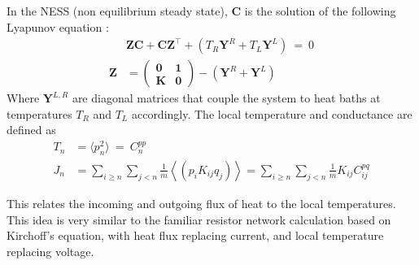 In the NESS (non equilibrium steady state), $\mathbf{C}$ 
is the solution of the following Lyapunov equation 
\cite{bodyfelt_unpub,zheng,zheng_heat_2011,bhatia_how_1997,dhar_heat_2008,rieder_properties_1967,*nakazawa_energy_1968,*matsuda_localization_1970}:
%
\begin{align}
&\mathbf{Z}\mathbf{C} + \mathbf{C}\mathbf{Z}^\intercal + (T_R\mathbf{Y}^R+T_L\mathbf{Y}^L) \ =\  0\\
\mathbf{Z} &= 
              \begin{pmatrix} 
                \mathbf{0} & \mathbf{1} \\
                \mathbf{K} & \mathbf{0} 
              \end{pmatrix} -(\mathbf{Y}^R+\mathbf{Y}^L)
\end{align}
%
Where $\mathbf{Y}^{L,R}$ are diagonal matrices that couple
the system to heat baths at temperatures $T_R$ and $T_L$ accordingly.
%
The local temperature and conductance are defined as
\begin{align}
T_n &= \langle p_n^2 \rangle \ = \ C^{pp}_{n} \\
J_n &= \sum_{i\ge n}\sum_{j<n} \frac{1}{m}\left\langle \left(p_i K_{ij} q_j\right) \right\rangle 
= \sum_{i\ge n}\sum_{j<n}\frac{1}{m}  K_{ij} C^{pq}_{ij}
\end{align}

This relates the incoming and outgoing flux of heat 
to the local temperatures. This idea is very similar
to the familiar resistor network calculation based on Kirchoff's equation, with 
heat flux replacing current, and local temperature replacing voltage. 
 

\begin{comment}
\section{Banded matrices spectrum}


For wide bandwidth and uncorrelated matrix elements, the high eigenvalues
should follow the Wigner semicircle law ($g(\lambda) = \frac{2}{\pi R^2}\sqrt{R^2-\lambda^2}$)
\cite{erdos_local_2012,fyodorov_scaling_1991,wigner_characteristic_1955}. However,
the low eigenvalues can still follow other rules, allowing for a transition
between diffusion and subdiffusion.
\end{comment}




